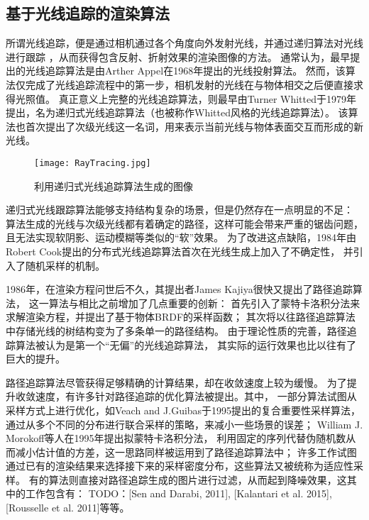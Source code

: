 \subsection{基于光线追踪的渲染算法}

所谓光线追踪，便是通过相机通过各个角度向外发射光线，并通过递归算法对光线进行跟踪
，从而获得包含反射、折射效果的渲染图像的方法。
通常认为，最早提出的光线追踪算法是由Arther Appel在1968年提出的光线投射算法\cite{RayCasting}。
然而，该算法仅完成了光线追踪流程中的第一步，相机发射的光线在与物体相交之后便直接求得光照值。
真正意义上完整的光线追踪算法，则最早由Turner Whitted于1979年提出，名为递归式光线追踪算法\cite{WhittedRayTracing}（也被称作Whitted风格的光线追踪算法）。
该算法也首次提出了次级光线这一名词，用来表示当前光线与物体表面交互而形成的新光线。

\begin{figure}[h]
    \centering
    \texttt{[image: RayTracing.jpg]}
    \caption{利用递归式光线追踪算法生成的图像}
    \label{tab:rayTrace}
\end{figure}

递归式光线跟踪算法能够支持结构复杂的场景，但是仍然存在一点明显的不足：
算法生成的光线与次级光线都有着确定的路径，这样可能会带来严重的锯齿问题，
且无法实现软阴影、运动模糊等类似的“软”效果。
为了改进这点缺陷，1984年由Robert Cook提出的分布式光线追踪算法\cite{DistributiveRayTracing}首次在光线生成上加入了不确定性，
并引入了随机采样的机制。

1986年，在渲染方程问世后不久，其提出者James Kajiya很快又提出了路径追踪算法\cite{PathTracing}，
这一算法与相比之前增加了几点重要的创新：
首先引入了蒙特卡洛积分法来求解渲染方程，并提出了基于物体BRDF的采样函数；
其次将以往路径追踪算法中存储光线的树结构变为了多条单一的路径结构。
由于理论性质的完善，路径追踪算法被认为是第一个“无偏”的光线追踪算法，
其实际的运行效果也比以往有了巨大的提升。

\label{PathTracingOptimization}
路径追踪算法尽管获得足够精确的计算结果，却在收敛速度上较为缓慢。
为了提升收敛速度，有许多针对路径追踪的优化算法被提出。其中，
一部分算法试图从采样方式上进行优化，如Veach and J.Guibas于1995提出的复合重要性采样\cite{MultipleImportanceSampling}算法，
通过从多个不同的分布进行联合采样的策略，来减小一些场景的误差；
William J. Morokoff等人在1995年提出拟蒙特卡洛积分法\cite{QuasiMonteCarlo}，
利用固定的序列代替伪随机数从而减小估计值的方差，这一思路同样被运用到了路径追踪算法中；
许多工作\cite{Belcour2013}\cite{AdaptiveSampling}试图通过已有的渲染结果来选择接下来的采样密度分布，这些算法又被统称为适应性采样。
有的算法则直接对路径追踪生成的图片进行过滤，从而起到降噪效果，这其中的工作包含有：
TODO：[Sen and Darabi, 2011], [Kalantari et al. 2015], [Rousselle et al. 2011]等等。

